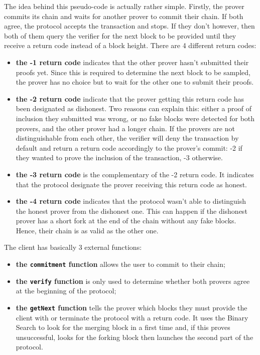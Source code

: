 The idea behind this pseudo-code is actually rather simple. Firstly, the prover commits its chain and waits for another prover to commit their chain. If both agree, the protocol accepts the transaction and stops. If they don't however, then both of them query the verifier for the next block to be provided until they receive a return code instead of a block height. There are 4 different return codes:

\begin{itemize}
    \item \textbf{the -1 return code} indicates that the other prover hasn't submitted their proofs yet. Since this is required to determine the next block to be sampled, the prover has no choice but to wait for the other one to submit their proofs.
    \item \textbf{the -2 return code} indicate that the prover getting this return code has been designated as dishonest. Two reasons can explain this: either a proof of inclusion they submitted was wrong, or no fake blocks were detected for both provers, and the other prover had a longer chain. If the provers are not distinguishable from each other, the verifier will deny the transaction by default and return a return code accordingly to the prover's commit: -2 if they wanted to prove the inclusion of the transaction, -3 otherwise.
    \item \textbf{the -3 return code} is the complementary of the -2 return code. It indicates that the protocol designate the prover receiving this return code as honest.
    \item \textbf{the -4 return code} indicates that the protocol wasn't able to distinguish the honest prover from the dishonest one. This can happen if the dishonest prover has a short fork at the end of the chain without any fake blocks. Hence, their chain is as valid as the other one.
\end{itemize}

The client has basically 3 external functions:

\begin{itemize}
    \item \textbf{the \texttt{commitment} function} allows the user to commit to their chain;
    \item \textbf{the \texttt{verify} function} is only used to determine whether both provers agree at the beginning of the protocol;
    \item \textbf{the \texttt{getNext} function} tells the prover which blocks they must provide the client with or terminate the protocol with a return code. It uses the Binary Search to look for the merging block in a first time and, if this proves unsuccessful, looks for the forking block then launches the second part of the protocol.
\end{itemize}

